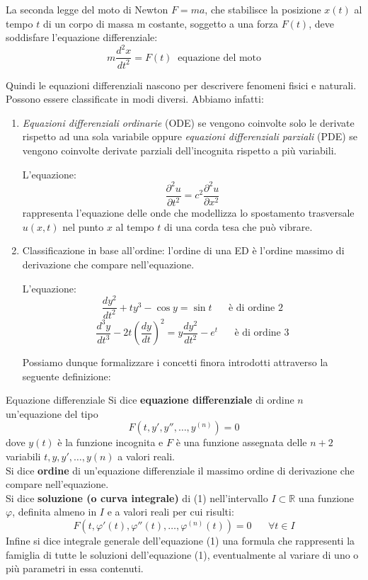 \documentclass[a4paper]{article}
\newcommand{\ex}[3][]{\begin{Example}{#2}{#1}#3\end{Example}}
\newcommand{\dfn}[3][]{\begin{Definition}[colbacktitle=green!75!black]{#2}{#1}#3\end{Definition}}
\begin{document}
\ex{}{La seconda legge del moto di Newton $F = ma$, che stabilisce la posizione
$x(t)$ al tempo $t$ di un corpo di massa m costante, soggetto a una forza $F(t)$, deve soddisfare
l'equazione differenziale:
\[m\frac{d^2x}{dt^2} = F(t) \; \; \text{equazione del moto}\]
}
\noindent
Quindi le equazioni differenziali nascono per descrivere fenomeni fisici e naturali. 
Possono essere classificate in modi diversi. Abbiamo infatti:
\begin{enumerate}
    \item \textit{Equazioni differenziali ordinarie} (ODE) se vengono coinvolte solo le derivate rispetto ad una sola variabile oppure \textit{equazioni differenziali parziali} (PDE) se vengono coinvolte derivate parziali
     dell'incognita rispetto a più variabili.
     \ex{}{L'equazione: \[\frac{\partial^2 u}{\partial t^2}=c^2 \frac{\partial^2u}{\partial x^2}\]
     rappresenta l'equazione delle onde che modellizza lo spostamento trasversale $u(x, t)$ nel
punto $x$ al tempo $t$ di una corda tesa che può vibrare.
     }
    \item Classificazione in base all'ordine: l'ordine di una ED è l'ordine massimo di derivazione che
    compare nell'equazione.
\ex{}{L'equazione: \[\frac{dy^2}{dt^2} + ty^3 - \cos{y} = \sin{t} \; \; \; \; \; \; \text{è di ordine 2}\]
 \[\frac{d^3y}{dt^3} - 2t\left(\frac{dy}{dt}\right)^2  = y \frac{dy^2}{dt^2} - e^t\; \; \; \; \; \; \text{è di ordine 3}\]
}
Possiamo dunque formalizzare i concetti finora introdotti attraverso la seguente definizione:
\end{enumerate}
\dfn{Equazione differenziale}{
Si dice \textbf{equazione differenziale} di ordine $n$ un'equazione del tipo
\begin{equation}
    F(t,y',y'', \dots , y^{(n)}) = 0   
\end{equation}
dove $y(t)$ è la funzione incognita e $F$ è una funzione assegnata delle $n + 2$ variabili $t, y, y'
, \dots , y(n)$ a valori reali.
\\
Si dice \textbf{ordine} di un'equazione differenziale il massimo ordine di derivazione che compare nell'equazione.\\
Si dice \textbf{soluzione (o curva integrale)} di (1) nell'intervallo $I \subset \mathbb{R}$ una funzione $\varphi$, definita almeno in $I$ e a valori reali per cui risulti:
\begin{equation*}
F(t, \varphi'(t), \varphi''(t), \dots , \varphi^{(n)}(t)) = 0 \; \; \; \; \; \; \forall t \in I
\end{equation*}
Infine si dice integrale generale dell'equazione (1) una formula che rappresenti la famiglia
di tutte le soluzioni dell'equazione (1), eventualmente al variare di uno o più parametri in essa
contenuti.
}
\end{document}
